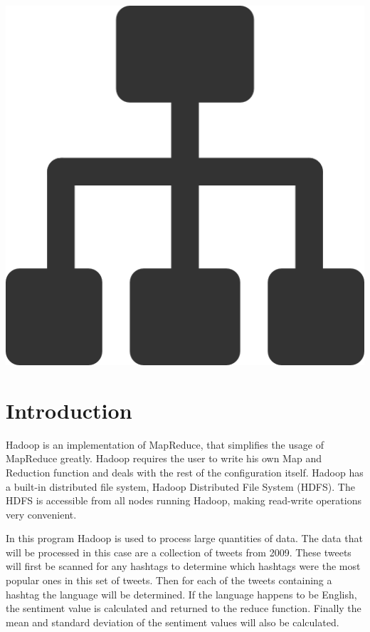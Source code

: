\documentclass[a4paper,12px]{article}
\begin{document}
\vspace{2cm}
\begin{center}
    \includegraphics[width=(\textwidth/5*3)]{parallel_tasks}
\end{center}
\clearpage

\tableofcontents
\vspace{5mm}


\section{Introduction}

Hadoop is an implementation of MapReduce, that simplifies the usage of MapReduce
greatly. Hadoop requires the user to write his own Map and Reduction function
and deals with the rest of the configuration itself. Hadoop has a built-in
distributed file system,  Hadoop Distributed File System (HDFS).  The HDFS is
accessible from all nodes running Hadoop, making read-write operations very
convenient.

In this program Hadoop is used to process large quantities of data. The data
that will be processed in this case are a collection of tweets from 2009. These
tweets will first be scanned for any hashtags to determine which hashtags were
the most popular ones in this set of tweets. Then for each of the tweets
containing a hashtag the language will be determined. If the language happens to
be English, the sentiment value is calculated and returned to the reduce
function. Finally the mean and standard deviation of the sentiment values will
also be calculated.
\end{document}
